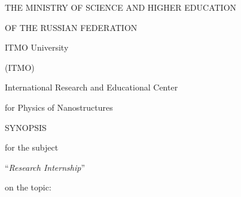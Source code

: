 \documentclass[12pt,a4paper]{article}
\begin{document}
\hypersetup{pageanchor=false}
\begin{titlepage}
    \thispagestyle{empty}
    \begin{center}
        \vspace*{1.45cm}

        {\large THE MINISTRY OF SCIENCE AND HIGHER EDUCATION\par}
        \vspace{0.22cm}
        {\large OF THE RUSSIAN FEDERATION\par}

        \vspace{1.25cm}

        {\large ITMO University\par}
        \vspace{0.18cm}
        {\large (ITMO)\par}

        \vspace{0.85cm}

        {\large International Research and Educational Center\par}
        \vspace{0.18cm}
        {\large for Physics of Nanostructures\par}

        \vspace{2.35cm}

        {\Large SYNOPSIS\par}

        \vspace{0.42cm}

        {\large for the subject\par}
        \vspace{0.18cm}
        {\large ``\textit{Research Internship}''\par}

        \vspace{0.56cm}

        {\large on the topic:\par}
        \vspace{0.22cm}
        \par
        \vspace{0.12cm}
        \par
        \vspace{0.12cm}
        \par
        \vspace{0.12cm}
        \par
    \end{center}


\end{titlepage}
\end{document}
